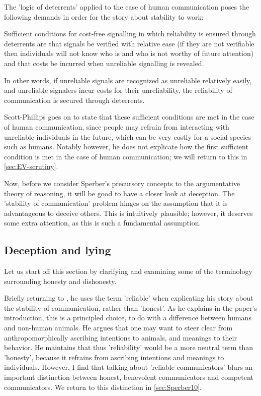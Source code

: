 The 'logic of deterrents' applied to the case of human communication poses the following demands in order for the story about stability to work:
\begin{quoting}
    Sufficient conditions for cost-free signalling in which reliability is ensured through deterrents are that signals be verified with relative ease (if they are not verifiable then individuals will not know who is and who is not worthy of future attention) and that costs be incurred when unreliable signalling is revealed.
    \hfill \citep[p.~?]{Scott-Phillips08}
\end{quoting}
In other words, if unreliable signals are recognized as unreliable relatively easily, and unreliable signalers incur costs for their unreliability, the reliability of communication is secured through deterrents.

Scott-Phillips goes on to state that these sufficient conditions are met in the case of human communication, since people may refrain from interacting with unreliable individuals in the future, which can be very costly for a social species such as humans.
Notably however, he does not explicate how the first sufficient condition is met in the case of human communication; we will return to this in \cref{sec:EV-scrutiny}.

Now, before we consider Sperber's precursory concepts to the argumentative theory of reasoning, it will be good to have a closer look at deception. The 'stability of communication' problem hinges on the assumption that it is advantageous to deceive others. This is intuitively plausible; however, it deserves some extra attention, as this is such a fundamental assumption.

\subsection{Deception and lying}
\label{sec:deception}


Let us start off this section by clarifying and examining some of the terminology surrounding honesty and dishonesty.

Briefly returning to \citet{Scott-Phillips08}, he uses the term 'reliable' when explicating his story about the stability of communication, rather than 'honest'. As he explains in the paper's introduction, this is a principled choice, to do with a difference between humans and non-human animals. He argues that one may want to steer clear from anthropomorphically ascribing intentions to animals, and meanings to their behavior. He maintains that thus 'reliability' would be a more neutral term than 'honesty', because it refrains from ascribing intentions and meanings to individuals.
However, I find that talking about 'reliable communicators' blurs an important distinction between honest, benevolent communicators and competent communicators. We return to this distinction in \cref{sec:Sperber10}.

